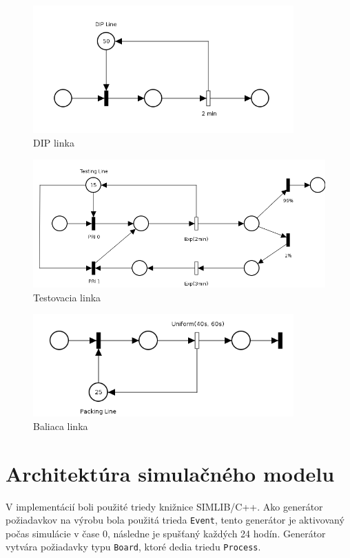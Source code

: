 \documentclass[12pt,a4paper,titlepage,final]{article}
\begin{document}
\begin{figure}[!h]
  \centering
  \includegraphics[width=10cm]{doc/dip.png}
  \caption{DIP linka}
\end{figure}

\begin{figure}[!h]
  \centering
  \includegraphics[width=14cm]{doc/tst.png}
  \caption{Testovacia linka}
\end{figure}

\begin{figure}[!h]
  \centering
  \includegraphics[width=10cm]{doc/pkg.png}
  \caption{Baliaca linka}
\end{figure}

\section{Architektúra simulačného modelu}
V implementácií boli použité triedy knižnice SIMLIB/C++. Ako generátor požiadavkov
na výrobu bola použitá trieda \texttt{Event}, tento generátor je aktivovaný počas simulácie
v čase 0, následne je spušťaný každých 24 hodín. Generátor vytvára požiadavky typu
\texttt{Board}, ktoré dedia triedu \texttt{Process}.
\end{document}
